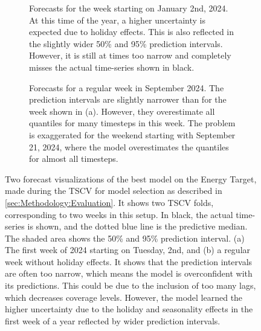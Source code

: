 \begin{figure}[htbp]
    \centering
    \begin{subfigure}[b]{0.95\textwidth}
        \centering
        
        \caption{Forecasts for the week starting on January 2nd, 2024. At this time of the year, a higher uncertainty is expected due to holiday effects. This is also reflected in the slightly wider 50\% and 95\% prediction intervals. However, it is still at times too narrow and completely misses the actual time-series shown in black.}
        \label{fig:forecast-plot-1}
    \end{subfigure}
    \begin{subfigure}[b]{0.95\textwidth}
        \centering
        
        \caption{Forecasts for a regular week in September 2024. The prediction intervals are slightly narrower than for the week shown in (a). However, they overestimate all quantiles for many timesteps in this week. The problem is exaggerated for the weekend starting with September 21, 2024, where the model overestimates the quantiles for almost all timesteps.}
        \label{fig:forecast-plot-2}
    \end{subfigure}
    \caption{Two forecast visualizations of the best model on the Energy Target, made during the TSCV for model selection as described in \cref{sec:Methodology:Evaluation}. It shows two TSCV folds, corresponding to two weeks in this setup. In black, the actual time-series is shown, and the dotted blue line is the predictive median. The shaded area shows the 50\% and 95\% prediction interval. (a) The first week of 2024 starting on Tuesday, 2nd, and (b) a regular week without holiday effects. It shows that the prediction intervals are often too narrow, which means the model is overconfident with its predictions. This could be due to the inclusion of too many lags, which decreases coverage levels. However, the model learned the higher uncertainty due to the holiday and seasonality effects in the first week of a year reflected by wider prediction intervals.}
    \label{fig:Forecast-visualization}
\end{figure}


